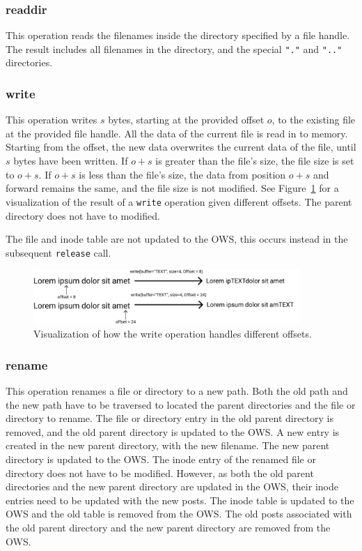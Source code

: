 \subsubsection{readdir}
This operation reads the filenames inside the directory specified by a file handle. The result includes all filenames in the directory, and the special \texttt{"."} and \texttt{".."} directories.

\subsubsection{write}
This operation writes $s$ bytes, starting at the provided offset $o$, to the existing file at the provided file handle. All the data of the current file is read in to memory. Starting from the offset, the new data overwrites the current data of the file, until $s$ bytes have been written. If $o + s$ is greater than the file's size, the file size is set to $o + s$. If $o + s$ is less than the file's size, the data from position $o + s$ and forward remains the same, and the file size is not modified. See Figure~\ref{fig:write_flow} for a visualization of the result of a \texttt{write} operation given different offsets. The parent directory does not have to modified. 

The file and inode table are not updated to the OWS, this occurs instead in the subsequent \texttt{release} call.

\begin{figure}[!ht]
	\begin{center}
	  \includegraphics[width=0.9\textwidth]{figures/write_flow.png}
	\end{center}
	\caption{Visualization of how the write operation handles different offsets.}
	\label{fig:write_flow}
\end{figure}

\subsubsection{rename}
This operation renames a file or directory to a new path. Both the old path and the new path have to be traversed to located the parent directories and the file or directory to rename. The file or directory entry in the old parent directory is removed, and the old parent directory is updated to the OWS. A new entry is created in the new parent directory, with the new filename. The new parent directory is updated to the OWS. The inode entry of the renamed file or directory does not have to be modified. However, as both the old parent directories and the new parent directory are updated in the OWS, their inode entries need to be updated with the new posts. The inode table is updated to the OWS and the old table is removed from the OWS. The old posts associated with the old parent directory and the new parent directory are removed from the OWS.

